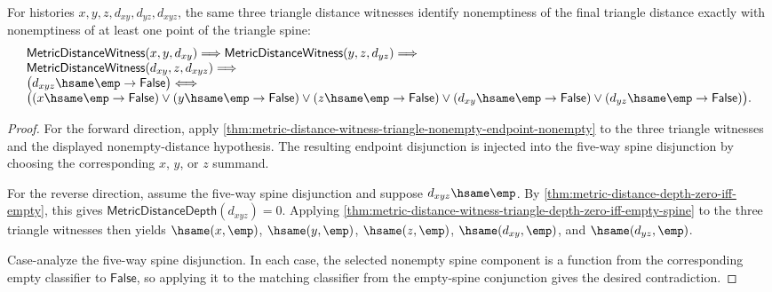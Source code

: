 \begin{theorem}
\label{thm:metric-distance-witness-triangle-nonempty-spine-iff-nonempty-distance}
For histories $x,y,z,d_{xy},d_{yz},d_{xyz}$, the same three triangle distance
witnesses identify nonemptiness of the final triangle distance exactly with
nonemptiness of at least one point of the triangle spine:
$$
\begin{array}{l}
\mathsf{MetricDistanceWitness}(x,y,d_{xy})\Longrightarrow
\mathsf{MetricDistanceWitness}(y,z,d_{yz})\Longrightarrow
\\
\mathsf{MetricDistanceWitness}(d_{xy},z,d_{xyz})\Longrightarrow
\\
\bigl(d_{xyz}\hsame\emp\to\mathsf{False}\bigr)
\Longleftrightarrow
\\
\bigl((x\hsame\emp\to\mathsf{False})\vee
(y\hsame\emp\to\mathsf{False})\vee
(z\hsame\emp\to\mathsf{False})\vee
(d_{xy}\hsame\emp\to\mathsf{False})\vee
(d_{yz}\hsame\emp\to\mathsf{False})\bigr).
\end{array}
$$
\end{theorem}
\begin{proof}
For the forward direction, apply
\autoref{thm:metric-distance-witness-triangle-nonempty-endpoint-nonempty} to
the three triangle witnesses and the displayed nonempty-distance hypothesis.
The resulting endpoint disjunction is injected into the five-way spine
disjunction by choosing the corresponding $x$, $y$, or $z$ summand.

For the reverse direction, assume the five-way spine disjunction and suppose
$d_{xyz}\hsame\emp$. By
\autoref{thm:metric-distance-depth-zero-iff-empty}, this gives
$\mathsf{MetricDistanceDepth}(d_{xyz})=0$. Applying
\autoref{thm:metric-distance-witness-triangle-depth-zero-iff-empty-spine} to
the three triangle witnesses then yields
$\hsame(x,\emp)$, $\hsame(y,\emp)$, $\hsame(z,\emp)$, $\hsame(d_{xy},\emp)$,
and $\hsame(d_{yz},\emp)$.

Case-analyze the five-way spine disjunction. In each case, the selected
nonempty spine component is a function from the corresponding empty classifier
to $\mathsf{False}$, so applying it to the matching classifier from the
empty-spine conjunction gives the desired contradiction.
\end{proof}

